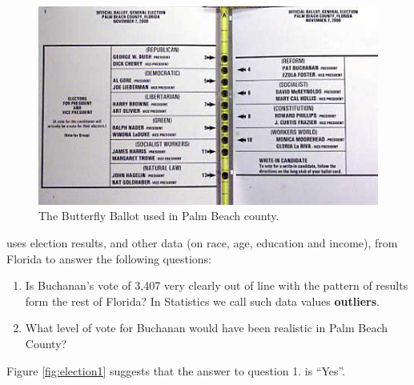 \documentclass[
  11pt,
  british,
  openany, a4paper]{book}
\providecommand{\tightlist}{%
  \setlength{\itemsep}{0pt}\setlength{\parskip}{0pt}}
\begin{document}
\begin{figure}

{\centering \includegraphics[width=0.75\linewidth]{images/butterflyballot} 

}

\caption{The Butterfly Ballot used in Palm Beach county.}\label{fig:butterfly}
\end{figure}

\citet{election} uses election results, and other data (on race, age, education and income), from Florida to answer the following questions:

\begin{enumerate}
\def\labelenumi{\arabic{enumi}.}
\tightlist
\item
  Is Buchanan's vote of 3,407 very clearly out of line with the pattern of results form the rest of Florida? In Statistics we call such data values \textbf{outliers}.
\item
  What level of vote for Buchanan would have been realistic in Palm Beach County?
\end{enumerate}

Figure \ref{fig:election1} suggests that the answer to question 1. is ``Yes''.
\end{document}
